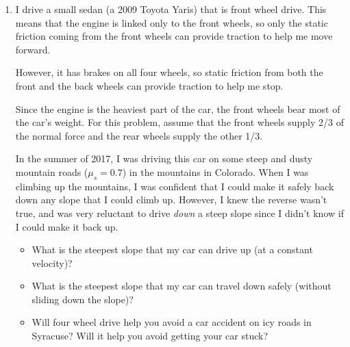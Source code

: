 \documentclass[12pt]{article}
\begin{document}
\begin{enumerate}
\item I drive a small sedan (a 2009 Toyota Yaris) that is front wheel drive. This means that the engine is linked only to the front wheels, so only the static friction coming from the front wheels can provide traction to help me move forward.

However, it has brakes on all four wheels, so static friction from both the front and the back wheels can provide traction to help me stop.

Since the engine is the heaviest part of the car, the front wheels bear most of the car's weight. For this problem, assume
that the front wheels supply 2/3 of the normal force and the rear wheels supply the other 1/3.

In the summer of 2017, I was driving this car on some steep and dusty mountain roads ($\mu_s = 0.7$) in the mountains in Colorado. When I was climbing up the mountains, I was confident that I could make it safely back down any slope that I could 
climb up. However, I knew the reverse wasn't true, and was very reluctant to drive {\it down} a steep slope since
I didn't know if I could make it back up.

\begin{itemize}
\item What is the steepest slope that my car can drive up (at a constant velocity)?
\item What is the steepest slope that my car can travel down safely (without sliding down the slope)?
\item Will four wheel drive help you avoid a car accident on icy roads in Syracuse? Will it help you avoid getting your 
car stuck?
\end{itemize}



    \end{enumerate}
\end{document}

